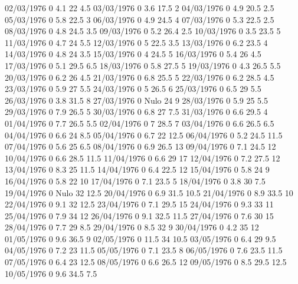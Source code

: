 02/03/1976  0      4.1    22     4.5 
03/03/1976  0      3.6    17.5   2 
04/03/1976  0      4.9    20.5   2.5 
05/03/1976  0      5.8    22.5   3 
06/03/1976  0      4.9    24.5   4 
07/03/1976  0      5.3    22.5   2.5 
08/03/1976  0      4.8    24.5   3.5 
09/03/1976  0      5.2    26.4   2.5 
10/03/1976  0      3.5    23.5   5 
11/03/1976  0      4.7    24     5.5 
12/03/1976  0      5      22.5   3.5 
13/03/1976  0      6.2    23.5   4 
14/03/1976  0      4.8    24     3.5 
15/03/1976  0      4      24.5   5 
16/03/1976  0      5.4    26     4.5 
17/03/1976  0      5.1    29.5   6.5 
18/03/1976  0      5.8    27.5   5 
19/03/1976  0      4.3    26.5   5.5 
20/03/1976  0      6.2    26     4.5 
21/03/1976  0      6.8    25.5   5 
22/03/1976  0      6.2    28.5   4.5 
23/03/1976  0      5.9    27     5.5 
24/03/1976  0      5      26.5   6 
25/03/1976  0      6.5    29     5.5 
26/03/1976  0      3.8    31.5   8 
27/03/1976  0     Nulo    24     9 
28/03/1976  0      5.9    25     5.5 
29/03/1976  0      7.9    26.5   5 
30/03/1976  0      6.8    27     7.5 
31/03/1976  0      6.6    29.5   4 
01/04/1976  0      7.7    26.5   5.5 
02/04/1976  0      7      28.5   7 
03/04/1976  0      6.6    26.5   6.5 
04/04/1976  0      6.6    24     8.5 
05/04/1976  0      6.7    22     12.5 
06/04/1976  0      5.2    24.5   11.5 
07/04/1976  0      5.6    25     6.5 
08/04/1976  0      6.9    26.5   13 
09/04/1976  0      7.1    24.5   12 
10/04/1976  0      6.6    28.5   11.5 
11/04/1976  0      6.6    29     17 
12/04/1976  0      7.2    27.5   12 
13/04/1976  0      8.3    25     11.5 
14/04/1976  0      6.4    22.5   12 
15/04/1976  0      5.8    24     9 
16/04/1976  0      5.8    22     10 
17/04/1976  0      7.1    23.5   5 
18/04/1976  0      3.8    30     7.5 
19/04/1976  0     Nulo    32     12.5 
20/04/1976  0      6.9    31.5   10.5 
21/04/1976  0      8.9    33.5   10 
22/04/1976  0      9.1    32     12.5 
23/04/1976  0      7.1    29.5   15 
24/04/1976  0      9.3    33     11 
25/04/1976  0      7.9    34     12 
26/04/1976  0      9.1    32.5   11.5 
27/04/1976  0      7.6    30     15 
28/04/1976  0      7.7    29     8.5 
29/04/1976  0      8.5    32     9 
30/04/1976  0      4.2    35     12 
01/05/1976  0      9.6    36.5   9 
02/05/1976  0      11.5   34     10.5 
03/05/1976  0      6.4    29     9.5 
04/05/1976  0      7.2    23     11.5 
05/05/1976  0      7.1    23.5   8 
06/05/1976  0      7.6    23.5   11.5 
07/05/1976  0      6.4    23     12.5 
08/05/1976  0      6.6    26.5   12 
09/05/1976  0      8.5    29.5   12.5 
10/05/1976  0      9.6    34.5   7.5 
